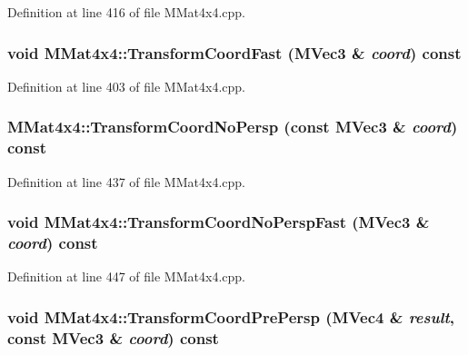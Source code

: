 Definition at line 416 of file MMat4x4.cpp.\hypertarget{class_m_mat4x4_1ce05837ed33fbbfafc051d23c9ab4e1}{
\subsubsection[{TransformCoordFast}]{\setlength{\rightskip}{0pt plus 5cm}void MMat4x4::TransformCoordFast ({\bf MVec3} \& {\em coord}) const}}
\label{class_m_mat4x4_1ce05837ed33fbbfafc051d23c9ab4e1}




Definition at line 403 of file MMat4x4.cpp.\hypertarget{class_m_mat4x4_6433902604e11fbc092ba36be233d2a1}{
\subsubsection[{TransformCoordNoPersp}]{ MMat4x4::TransformCoordNoPersp (const {\bf MVec3} \& {\em coord}) const}}
\label{class_m_mat4x4_6433902604e11fbc092ba36be233d2a1}




Definition at line 437 of file MMat4x4.cpp.\hypertarget{class_m_mat4x4_ea380b26ff885243bda1f33dd851177b}{
\subsubsection[{TransformCoordNoPerspFast}]{\setlength{\rightskip}{0pt plus 5cm}void MMat4x4::TransformCoordNoPerspFast ({\bf MVec3} \& {\em coord}) const}}
\label{class_m_mat4x4_ea380b26ff885243bda1f33dd851177b}




Definition at line 447 of file MMat4x4.cpp.\hypertarget{class_m_mat4x4_9e21fa3a1796f4dc4f393284385222ce}{
\subsubsection[{TransformCoordPrePersp}]{\setlength{\rightskip}{0pt plus 5cm}void MMat4x4::TransformCoordPrePersp ({\bf MVec4} \& {\em result}, \/  const {\bf MVec3} \& {\em coord}) const}}
\label{class_m_mat4x4_9e21fa3a1796f4dc4f393284385222ce}





